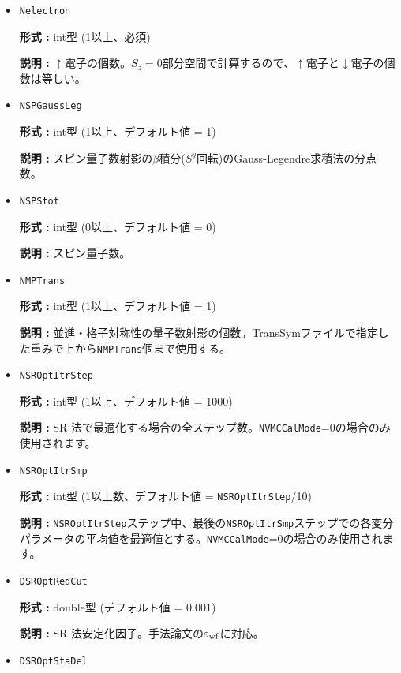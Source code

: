 \begin{itemize}
{\bf 説明 :} サイト数を指定する整数。  

\item  \verb|Nelectron|

{\bf 形式 :} {int型 (1以上、必須)}

{\bf 説明 :} $\uparrow$電子の個数。$S_z=0$部分空間で計算するので、$\uparrow$電子と$\downarrow$電子の個数は等しい。

 \item  \verb|NSPGaussLeg|

{\bf 形式 :} {int型 (1以上、デフォルト値 = 1)}

{\bf 説明 :} スピン量子数射影の$\beta$積分($S^y$回転)のGauss-Legendre求積法の分点数。

 \item  \verb|NSPStot|

{\bf 形式 :} int型 (0以上、デフォルト値 = 0)

{\bf 説明 :}  スピン量子数。

 \item  \verb|NMPTrans|

{\bf 形式 :} int型 (1以上、デフォルト値 = 1)

{\bf 説明 :} 
並進・格子対称性の量子数射影の個数。TransSymファイルで指定した重みで上から\verb|NMPTrans|個まで使用する。

 \item  \verb|NSROptItrStep|

{\bf 形式 :} int型 (1以上、デフォルト値 = 1000)

{\bf 説明 :} 
SR 法で最適化する場合の全ステップ数。\verb|NVMCCalMode|=0の場合のみ使用されます。
 
 \item  \verb|NSROptItrSmp|

{\bf 形式 :} int型 (1以上数、デフォルト値 = \verb|NSROptItrStep|/10)

{\bf 説明 :} \verb|NSROptItrStep|ステップ中、最後の\verb|NSROptItrSmp|ステップでの各変分パラメータの平均値を最適値とする。\verb|NVMCCalMode|=0の場合のみ使用されます。

\item   \verb|DSROptRedCut|
   
{\bf 形式 :} double型 (デフォルト値 = 0.001)

{\bf 説明 :} SR 法安定化因子。手法論文\cite{Tahara2008}の$\varepsilon_{\rm wf}$に対応。

 \item  \verb|DSROptStaDel| 
   

\end{itemize}
